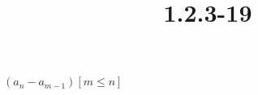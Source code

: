 \documentclass{article}
\title{1.2.3-19}
\begin{document}
\maketitle

$(a_n - a_{m-1})[m \leq n]$
\end{document}

